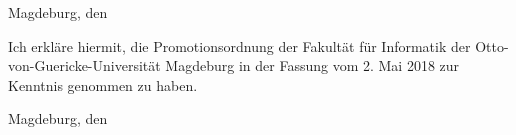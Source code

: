 \documentclass[oneside]{scrartcl}
\makeatletter
\let\theauthor\@author
\let\thedate\@date
\makeatother
\begin{document}
\vspace*{\baselineskip}

%
\hfill{}Magdeburg, den \thedate
%

\vspace*{1.5cm}

%
\hfill{}\theauthor
%
%
Ich erkläre hiermit, die Promotionsordnung der Fakultät für Informatik der
Otto-von-Guericke-Universität Magdeburg in der Fassung vom 2. Mai 2018 zur
Kenntnis genommen zu haben.
%

\vspace*{\baselineskip}

%
\hfill{}Magdeburg, den \thedate
%

\vspace*{1.5cm}

%
\hfill{}\theauthor
\end{document}
